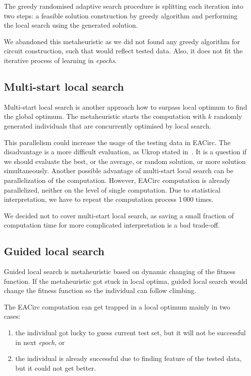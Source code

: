 \documentclass[
  print, %
  Table,   %
  nolof,     %
  nolot,     %
  11pt, %
  oneside  %
]{fithesis3}
\begin{document}
The greedy randomised adaptive search procedure is splitting each iteration into two steps: a feasible solution construction by greedy algorithm and performing the local search using the generated solution.

We abandoned this metaheuristic as we did not found any greedy algorithm for circuit construction, such that would reflect tested data. Also, it does not fit the iterative process of learning in \textit{epochs}.

\subsection{Multi-start local search}
\label{subsec:opt-single-sol-msls}

Multi-start local search is another approach how to surpass local optimum to find the global optimum. The metaheuristic starts the computation with $k$ randomly generated individuals that are concurrently optimised by local search.

This parallelism could increase the usage of the testing data in EACirc. The disadvantage is a more difficult evaluation, as Ukrop stated in~\cite[chapter~5]{ukropBcThesis}. It is a question if we should evaluate the best, or the average, or random solution, or more solution simultaneously. Another possible advantage of multi-start local search can be parallelization of the computation. However, EACirc computation is already parallelized, neither on the level of single computation. Due to statistical interpretation, we have to repeat the computation process 1\,000 times.

We decided not to cover multi-start local search, as saving a small fraction of computation time for more complicated interpretation is a bad trade-off.

\subsection{Guided local search}
\label{subsec:opt-single-sol-gls}

Guided local search is metaheuristic based on dynamic changing of the fitness function. If the metaheuristic got stuck in local optima, guided local search would change the fitness function so the individual can follow climbing.

The EACirc computation can get trapped in a local optimum mainly in two cases:

\begin{enumerate}[noitemsep,topsep=3pt,parsep=3pt,partopsep=3pt]
    \item the individual got lucky to guess current test set, but it will not be successful in next \textit{epoch}, or
    \item the individual is already successful due to finding feature of the tested data, but it could not get better.
\end{enumerate}
\end{document}
